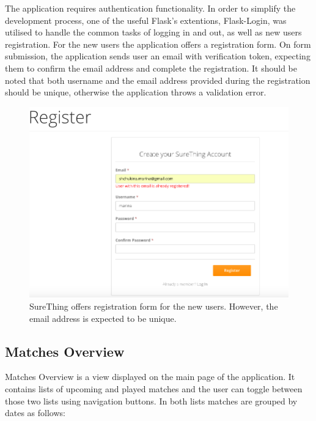The application requires authentication functionality. In order to simplify the development process, one of the useful Flask's extentions, Flask-Login, was utilised to handle the common tasks of logging in and out, as well as new users registration. For the new users the application offers a registration form. On form submission, the application sends user an email with verification token, expecting them to confirm the email address and complete the registration. It should be noted that both username and the email address provided during the registration should be unique, otherwise the application throws a validation error.

\begin{figure}[H]
	\begin{center}
		\includegraphics[width=.60\linewidth,natwidth=610,natheight=642]{impl/images/registrationFormError}
		\caption{SureThing offers registration form for the new users. However, the email address is expected to be unique.} \label{fig:registrationformerror}
	\end{center}
\end{figure}




\subsection{Matches Overview}
Matches Overview is a view displayed on the main page of the application. It contains lists of upcoming and played matches and the user can toggle between those two lists using navigation buttons. In both lists matches are grouped by dates as follows:


